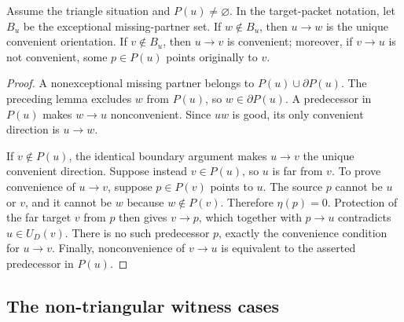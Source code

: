 \begin{lemma}
\label{lem:triangle-partner-canonical-direction}
Assume the triangle situation and $P(u)\ne\varnothing$.  In the
target-packet notation, let $B_u$ be the exceptional missing-partner
set.  If $w\notin B_u$, then $u\to w$ is the unique convenient
orientation.  If $v\notin B_u$, then $u\to v$ is convenient;
moreover, if $v\to u$ is not convenient, some $p\in P(u)$ points
originally to $v$.
\end{lemma}
\begin{proof}
A nonexceptional missing partner belongs to $P(u)\cup\partial P(u)$.
The preceding lemma excludes $w$ from $P(u)$, so $w\in\partial P(u)$.
A predecessor in $P(u)$ makes $w\to u$ nonconvenient.  Since $uw$
is good, its only convenient direction is $u\to w$.

If $v\notin P(u)$, the identical boundary argument makes $u\to v$
the unique convenient direction.  Suppose instead $v\in P(u)$,
so $u$ is far from $v$.  To prove convenience of $u\to v$, suppose
$p\in P(v)$ points to $u$.  The source $p$ cannot be $u$ or $v$,
and it cannot be $w$ because $w\notin P(v)$.  Therefore $\eta(p)=0$.
Protection of the far target $v$ from $p$ then gives $v\to p$,
which together with $p\to u$ contradicts $u\in U_D(v)$.
There is no such predecessor $p$, exactly the convenience condition
for $u\to v$.  Finally, nonconvenience of $v\to u$ is equivalent
to the asserted predecessor in $P(u)$.
\end{proof}

\subsection{The non-triangular witness cases}


